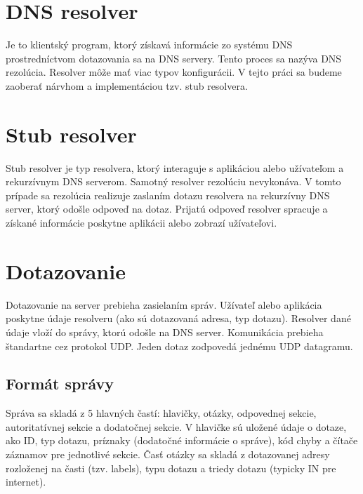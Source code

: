 \section{DNS resolver}
\label{DNS resolver}
Je to klientský program, ktorý získavá informácie zo systému DNS prostredníctvom dotazovania sa na DNS servery. Tento proces sa nazýva DNS rezolúcia.
Resolver môže mať viac typov konfigurácii. 
V tejto práci sa budeme zaoberať nárvhom a implementáciou tzv. stub resolvera.



\section{Stub resolver}
\label{Stub resolver}
Stub resolver je typ resolvera, ktorý interaguje s aplikáciou alebo užívateľom a rekurzívnym DNS serverom. Samotný resolver rezolúciu nevykonáva.
V tomto prípade sa rezolúcia realizuje zaslaním dotazu resolvera na rekurzívny DNS server, ktorý odošle odpoveď na dotaz.
Prijatú odpoveď resolver spracuje a získané informácie poskytne aplikácii alebo zobrazí užívateľovi.

\section{Dotazovanie}
\label{Dotazovanie}

Dotazovanie na server prebieha zasielaním správ. Užívateľ alebo aplikácia poskytne údaje resolveru (ako sú dotazovaná adresa, typ dotazu).
Resolver dané údaje vloží do správy, ktorú odošle na DNS server. Komunikácia prebieha štandartne cez protokol UDP. Jeden dotaz zodpovedá jednému UDP datagramu.

\subsection{Formát správy}
\label{Formát správy}

Správa sa skladá z 5 hlavných častí: hlavičky, otázky, odpovednej sekcie, autoritatívnej sekcie a dodatočnej sekcie. 
V hlavičke sú uložené údaje o dotaze, ako ID, typ dotazu, príznaky (dodatočné informácie o správe), kód chyby a čítače záznamov pre jednotlivé sekcie.
Časť otázky sa skladá z dotazovanej adresy rozloženej na časti (tzv. labels), typu dotazu a triedy dotazu (typicky IN pre internet). 

\newpage

